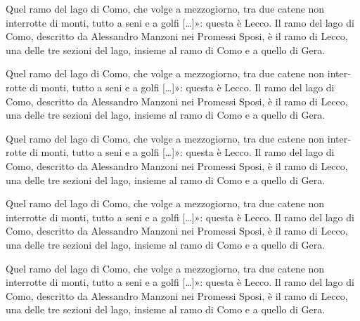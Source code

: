 \documentclass[11pt,b5paper]{book}
\begin{document}
Quel ramo del lago di Como, che volge a mezzogiorno, tra due catene non interrotte di monti, tutto a seni e a golfi […]»: questa è Lecco. Il ramo del lago di Como, descritto da Alessandro Manzoni nei Promessi Sposi, è il ramo di Lecco, una delle tre sezioni del lago, insieme al ramo di Como e a quello di Gera.

\textlatin{Quel ramo del lago di Como, che volge a mezzogiorno, tra due catene non interrotte di monti, tutto a seni e a golfi […]»: questa è Lecco. Il ramo del lago di Como, descritto da Alessandro Manzoni nei Promessi Sposi, è il ramo di Lecco, una delle tre sezioni del lago, insieme al ramo di Como e a quello di Gera.}

\textgerman{Quel ramo del lago di Como, che volge a mezzogiorno, tra due catene non interrotte di monti, tutto a seni e a golfi […]»: questa è Lecco. Il ramo del lago di Como, descritto da Alessandro Manzoni nei Promessi Sposi, è il ramo di Lecco, una delle tre sezioni del lago, insieme al ramo di Como e a quello di Gera.}

\numberlinefalse
\begin{pairs}
	\begin{Leftside}
		\beginnumbering
		\pstart
		\noindent Quel ramo del lago di Como, che volge a mezzogiorno, tra due catene non interrotte di monti, tutto a seni e a golfi […]»: questa è Lecco. Il ramo del lago di Como, descritto da Alessandro Manzoni nei Promessi Sposi, è il ramo di Lecco, una delle tre sezioni del lago, insieme al ramo di Como e a quello di Gera.
		\pend
	\end{Leftside}

	\begin{Rightside}
		\beginnumbering
		\pstart
		\noindent Quel ramo del lago di Como, che volge a mezzogiorno, tra due catene non interrotte di monti, tutto a seni e a golfi […]»: questa è Lecco. Il ramo del lago di Como, descritto da Alessandro Manzoni nei Promessi Sposi, è il ramo di Lecco, una delle tre sezioni del lago, insieme al ramo di Como e a quello di Gera.
		\pend
		\endnumbering
	\end{Rightside}
\end{pairs}
\Columns
\numberlinetrue
\end{document}
